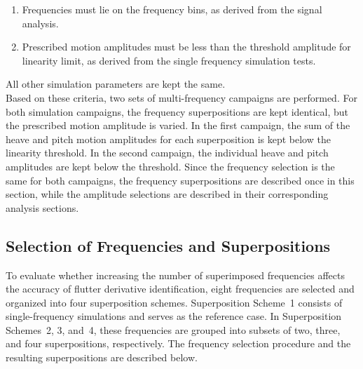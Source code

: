 \documentclass[../main]{subfiles}
\begin{document}
\begin{enumerate}
    \setlength{\itemsep}{0pt}\setlength{\parskip}{0pt}
    \item Frequencies must lie on the frequency bins, as derived from the signal analysis.
    \item Prescribed motion amplitudes must be less than the threshold amplitude for linearity limit, as derived 
    from the single frequency simulation tests.
\end{enumerate}

All other simulation parameters are kept the same.\\

Based on these criteria, two sets of multi-frequency campaigns are performed.
For both simulation campaigns, the frequency superpositions are kept identical, but the prescribed motion amplitude is varied.
In the first campaign, the sum of the heave and pitch motion amplitudes for each 
superposition is kept below the linearity threshold.
In the second campaign, the individual heave and pitch amplitudes are kept below the 
threshold.
Since the frequency selection is the same for both campaigns, the frequency superpositions are described once in this 
section, while the amplitude selections are described in their corresponding analysis sections.\\

\subsection{Selection of Frequencies and Superpositions}
\label{sec:Selection of Frequencies and Superpositions}

To evaluate whether increasing the number of superimposed frequencies affects 
the accuracy of flutter derivative identification, eight frequencies are selected and 
organized into four superposition schemes.
Superposition Scheme~1 consists of single-frequency 
simulations and serves as the reference case.
In Superposition Schemes~2, 3, and~4, these 
frequencies are grouped into subsets of two, three, and four superpositions, respectively.
The frequency selection procedure and the resulting superpositions 
are described below.\\
\end{document}
